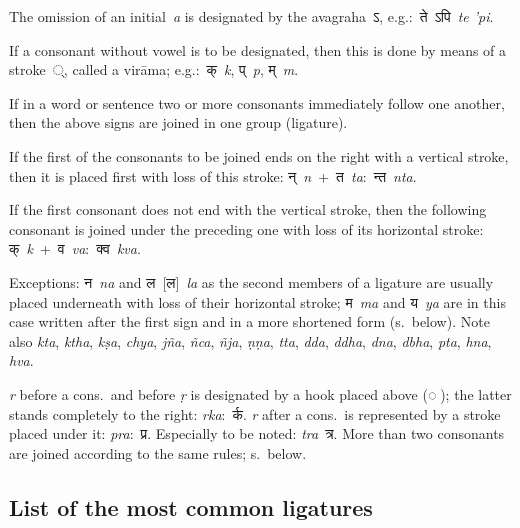 \documentclass{article}
\newcommand{\siddhanta}[1]{\mbox{\Siddhanta#1}}
\newcommand{\siddhantaII}[1]{\mbox{\SiddhantaII#1}}
\newcommand{\lingual}[1]{\textit{#1}}
\newcommand{\siddhantalingual}[2]{\siddhanta{#1}~\lingual{#2}}
\newcommand{\alt}[2]{#1~[#2]}
\newcommand{\siddhantaIIsiddhanta}[2]{\alt{\siddhantaII{#1}}{\siddhanta{#2}}}
\newcommand{\siddhantaIIsiddhantalingual}[3]{\siddhantaIIsiddhanta{#1}{#2}~\lingual{#3}}
\begin{document}
The omission of an initial~\lingual{a} is designated by the avagraha~\siddhanta{ऽ}, e.g.:~\siddhantalingual{ते ऽपि}{te 'pi}.

If a consonant without vowel is to be designated, then this is done by means of a stroke~\siddhanta{्}, called a virāma; e.g.:~\siddhantalingual{क्}{k}, \siddhantalingual{प्}{p}, \siddhantalingual{म्}{m}.

If in a word or sentence two or more consonants immediately follow one another, then the above signs are joined in one group (ligature).

If the first of the consonants to be joined ends on the right with a vertical stroke, then it is placed first with loss of this stroke: \siddhantalingual{न्}{n}~+~\siddhantalingual{त}{ta}:~\siddhantalingual{न्त}{nta}.

If the first consonant does not end with the vertical stroke, then the following consonant is joined under the preceding one with loss of its horizontal stroke: \siddhantalingual{क्}{k}~+~\siddhantalingual{व}{va}:~\siddhantalingual{क्व}{kva}.

Exceptions: \siddhantalingual{न}{na} and \siddhantaIIsiddhantalingual{ल}{ल}{la} as the second members of a ligature are usually placed underneath with loss of their horizontal stroke; \siddhantalingual{म}{ma} and \siddhantalingual{य}{ya} are in this case written after the first sign and in a more shortened form (s.~below). Note also \lingual{kta}, \lingual{ktha}, \lingual{kṣa}, \lingual{chya}, \lingual{jña}, \lingual{ñca}, \lingual{ñja}, \lingual{ṇṇa}, \lingual{tta}, \lingual{dda}, \lingual{ddha}, \lingual{dna}, \lingual{dbha}, \lingual{pta}, \lingual{hna}, \lingual{hva}.

\lingual{r} before a cons.\ and before \lingual{ṛ} is designated by a hook placed above (\siddhanta{◌}); the latter stands completely to the right: \lingual{rka}:~\siddhanta{र्क}. \lingual{r} after a cons.\ is represented by a stroke placed under it: \lingual{pra}:~\siddhanta{प्र}. Especially to be noted: \lingual{tra}~\siddhanta{त्र}. More than two consonants are joined according to the same rules; s.~below.


\subsection*{List of the most common ligatures}
\end{document}
